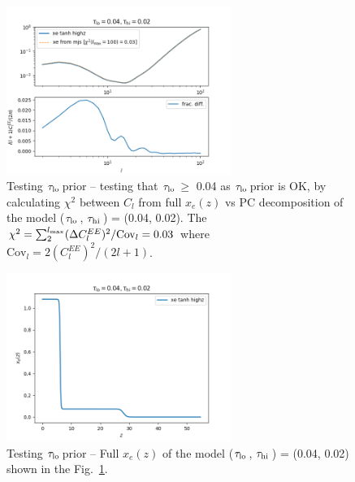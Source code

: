 \documentclass[prd,amsmath,amssymb,floatfix,superscriptaddress,nofootinbib]{revtex4-1}
\newcommand{\tauhi}{$\tau_{\rm hi}\,$}
\newcommand{\taulo}{$\tau_{\rm lo}\,$}
\begin{document}
\begin{figure}
\includegraphics[width=0.65\textwidth]{cosmomc_kde/taulo_prior_test/plot_cls_taulo_0p04_tauhi_0p02.png}
\caption{Testing \taulo prior -- testing that \taulo $\geq$ 0.04 as \taulo prior is OK, by calculating $\chi^2$ between $C_l$ from full $x_e(z)$ vs PC decomposition of the model (\taulo, \tauhi) = (0.04, 0.02). The $\chi^2 = \sum_{2}^{l_{\rm max}} (\Delta C_l^{EE})^2 / \mathrm{Cov}_l = 0.03$ where $\mathrm{Cov}_l = 2 (C_l^{EE})^2/(2l+1)$. 
} 
\label{fig:taulo_prior_test_cl}
\end{figure}

\begin{figure}
\includegraphics[width=0.65\textwidth]{cosmomc_kde/taulo_prior_test/plot_xez_taulo_0p04_tauhi_0p02.png}
\caption{Testing \taulo prior -- Full $x_e(z)$ of the model (\taulo, \tauhi) = (0.04, 0.02) shown in the Fig.~\ref{fig:taulo_prior_test_cl}. 
}
\label{fig:tau_lo_prior_test_xe}
\end{figure}



\end{document}
